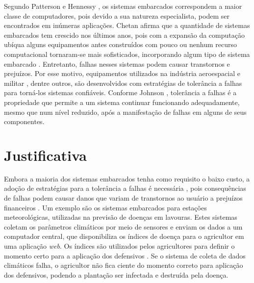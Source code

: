 Segundo Patterson e Hennessy \cite{Patterson:2007}, os sistemas embarcados correspondem a maior classe de computadores, pois devido a sua natureza especialista, podem ser encontrados em inúmeras aplicações. Chetan \cite{Chetan:2005} afirma que a quantidade de sistemas embarcados tem crescido nos últimos anos, pois com a expansão da computação ubíqua alguns equipamentos antes construídos com pouco ou nenhum recurso computacional tornaram-se mais sofisticados, incorporando algum tipo de sistema embarcado \cite{Kruger:2014}. Entretanto, falhas nesses sistemas podem causar transtornos e prejuízos. Por esse motivo, equipamentos utilizados na indústria aeroespacial e militar \cite{Nelson:1990}, dentre outros, são desenvolvidos com estratégias de tolerância a falhas para torná-los sistemas confiáveis. Conforme Johnson \cite{Johnson:1984}, tolerância a falhas é a propriedade que permite a um sistema continuar funcionando adequadamente, mesmo que num nível reduzido, após a manifestação de falhas em alguns de seus componentes. 


\section{Justificativa}

Embora a maioria dos sistemas embarcados tenha como requisito o baixo custo, a adoção de estratégias para a tolerância a falhas é necessária \cite{Thomas:1996}, pois consequências de falhas podem causar danos que variam de transtornos ao usuário a prejuízos financeiros \cite{Patterson:2007}. Um exemplo são os sistemas embarcados para estações meteorológicas, utilizadas na previsão de doenças em lavouras. Estes sistemas coletam os parâmetros climáticos por meio de sensores e enviam os dados a um computador central, que disponibiliza os índices de doença para o agricultor em uma aplicação \textit{web}. Os índices são utilizados pelos agricultores para definir o momento certo para a aplicação dos defensivos \cite{Reis:2004,Iaione:1999}. Se o sistema de coleta de dados climáticos falha, o agricultor não fica ciente do momento correto para aplicação dos defensivos, podendo a plantação ser infectada e destruída pela doença.

